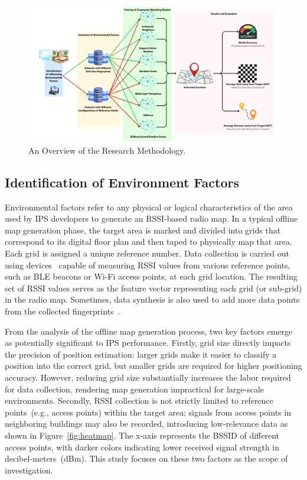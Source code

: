 \documentclass[runningheads]{llncs}
\begin{document}
\begin{figure}[th!]
        \centering
        \includegraphics[width=\linewidth]{figures/meth1.png}
        \caption{An Overview of the Research Methodology.}
        \label{fig:research-method}
\end{figure}

\subsection{Identification of Environment Factors}\label{ssec:identification-env-factors}

Environmental factors refer to any physical or logical characteristics of the area used by IPS developers to generate an RSSI-based radio map. In a typical offline map generation phase, the target area is marked and divided into grids that correspond to its digital floor plan and then taped to physically map that area. Each grid is assigned a unique reference number. Data collection is carried out using devices~\cite{add3,add4} capable of measuring RSSI values from various reference points, such as BLE beacons or Wi-Fi access points, at each grid location. The resulting set of RSSI values serves as the feature vector representing each grid (or sub-grid) in the radio map. Sometimes, data synthesis is also used to add more data points from the collected fingerprints~\cite{LRE6}.

From the analysis of the offline map generation process, two key factors emerge as potentially significant to IPS performance. Firstly, grid size directly impacts the precision of position estimation: larger grids make it easier to classify a position into the correct grid, but smaller grids are required for higher positioning accuracy. However, reducing grid size substantially increases the labor required for data collection, rendering map generation impractical for large-scale environments. Secondly, RSSI collection is not strictly limited to reference points~(e.g., access points) within the target area; signals from access points in neighboring buildings may also be recorded, introducing low-relevance data as shown in Figure~\ref{fig:heatmap}. The x-axis represents the BSSID of different access points, with darker colors indicating lower received signal strength in decibel-meters~(dBm). This study focuses on these two factors as the scope of investigation.
\end{document}
